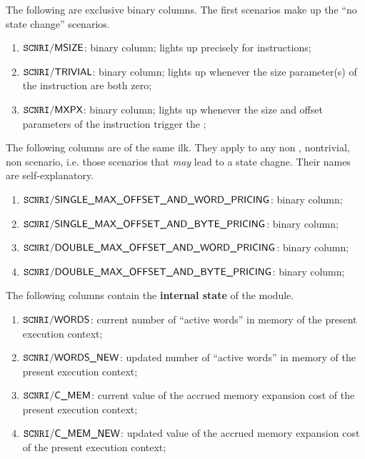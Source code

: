 The following are exclusive binary columns.
The first scenarios make up the ``no state change'' scenarios.
\begin{enumerate}
	\item $\texttt{SCNRI}\textsf{/}{\textsf{MSIZE}}$:
		binary column;
		lights up precisely for  instructions;
	\item $\texttt{SCNRI}\textsf{/}{\textsf{TRIVIAL}}$:
		binary column;
		lights up whenever the size parameter(s) of the instruction are both zero;
	\item $\texttt{SCNRI}\textsf{/}{\textsf{MXPX}}$:
		binary column;
		lights up whenever the size and offset parameters of the instruction trigger the \mxpxSH{};
\end{enumerate}
The following columns are of the same ilk.
They apply to any
non ,
nontrivial,
non \mxpxSH{} scenario,
i.e. those scenarios that \emph{may} lead to a state chagne.
Their names are self-explanatory.
\begin{enumerate}[resume]
	\item $\texttt{SCNRI}\textsf{/}{\textsf{SINGLE\_MAX\_OFFSET\_AND\_WORD\_PRICING}}$:
		binary column;
	\item $\texttt{SCNRI}\textsf{/}{\textsf{SINGLE\_MAX\_OFFSET\_AND\_BYTE\_PRICING}}$:
		binary column;
	\item $\texttt{SCNRI}\textsf{/}{\textsf{DOUBLE\_MAX\_OFFSET\_AND\_WORD\_PRICING}}$:
		binary column;
	\item $\texttt{SCNRI}\textsf{/}{\textsf{DOUBLE\_MAX\_OFFSET\_AND\_BYTE\_PRICING}}$:
		binary column;
\end{enumerate}
The following columns contain the \textbf{internal state} of the \mxpMod{} module.
\begin{enumerate}[resume]
	\item $\texttt{SCNRI}\textsf{/}{\textsf{\textsf{WORDS}}}$:
		current number of ``active words'' in memory of the present execution context;
	\item $\texttt{SCNRI}\textsf{/}{\textsf{\textsf{WORDS\_NEW}}}$:
		updated number of ``active words'' in memory of the present execution context;
	\item $\texttt{SCNRI}\textsf{/}{\textsf{\textsf{C\_MEM}}}$:
		current value of the accrued memory expansion cost of the present execution context;
	\item $\texttt{SCNRI}\textsf{/}{\textsf{\textsf{C\_MEM\_NEW}}}$:
		updated value of the accrued memory expansion cost of the present execution context;
\end{enumerate}
